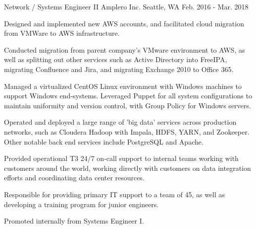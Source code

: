 \begin{cventries}

\cventry
{Network / Systems Engineer II} %
{Amplero Inc.} %
{Seattle, WA} %
{Feb. 2016 - Mar. 2018} %
{ %
\begin{cvitems}
\item {Designed and implemented new AWS accounts, and facilitated cloud migration from VMWare to AWS infrastructure.}
\item {Conducted migration from parent company's VMware environment to AWS, as well as splitting out other services such as Active Directory into FreeIPA, migrating Confluence and Jira, and migrating Exchange 2010 to Office 365.}
\item {Managed a virtualized CentOS Linux environment with Windows machines to support Windows end-systems. Leveraged Puppet for all system configurations to maintain uniformity and version control, with Group Policy for Windows servers.}
\item {Operated and deployed a large range of 'big data' services across production networks, such as Cloudera Hadoop with Impala, HDFS, YARN, and Zookeeper. Other notable back end services include PostgreSQL and Apache.}
\item {Provided operational T3 24/7 on-call support to internal teams working with customers around the world, working directly with customers on data integration efforts and coordinating data center resources.}
\item {Responsible for providing primary IT support to a team of 45, as well as developing a training program for junior engineers.}\
\item {Promoted internally from Systems Engineer I.}
\end{cvitems}
}



\end{cventries}
